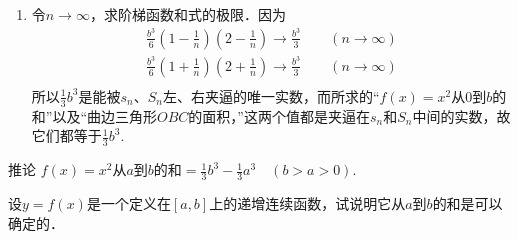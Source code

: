 \begin{solution}
\begin{enumerate}
\item 令$n\to\infty$，求阶梯函数和式的极限．因为
\[\begin{split}
    \frac{b^3}{6} \left(1-\frac{1}{n}\right)\left(2-\frac{1}{n}\right)\to \frac{b^3}{3}\qquad (n\to\infty)\\
    \frac{b^3}{6} \left(1+\frac{1}{n}\right)\left(2+\frac{1}{n}\right)\to \frac{b^3}{3}\qquad (n\to\infty)\\
\end{split}\]
所以$\frac{1}{3}b^3$是能被$s_n$、$S_n$左、右夹逼的唯一实数，而所求的“$f(x)=x^2$从0到$b$的和”以及“曲边三角形$OBC$的面积，”这两个值都是夹逼在$s_n$和$S_n$中间的实数，故它们都等于$\frac{1}{3}b^3$.
\end{enumerate}
\end{solution}

\begin{blk}
    {推论} $f(x)=x^2$从$a$到$b$的和$=\frac{1}{3}b^3-\frac{1}{3}a^3\quad  (b> a> 0)$.
\end{blk}


\begin{example}
设$y=f(x)$是一个定义在$[a,b]$上的递增连续函数，试说明它从$a$到$b$的和是可以确定的．
\end{example}

\begin{figure}[htp]
    \centering
{}
    \caption{}
\end{figure}

